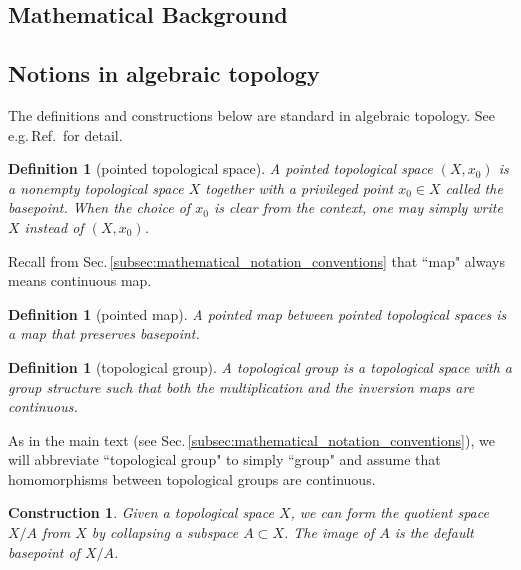 \documentclass[sort&compress]{elsarticle}
\theoremstyle{theoremstyle}
\theoremstyle{framedtheoremstyle}
\theoremstyle{definitionstyle}
\newtheorem{dfn}[nul]{Definition}%
\theoremstyle{definitionstyle}
\theoremstyle{definitionstyle}
\theoremstyle{definitionstyle}
\newtheorem{cnstr}[nul]{Construction}
\theoremstyle{nameddefinitionstyle}
\theoremstyle{framednameddefinitionstyle}
\theoremstyle{proofstyle}
\theoremstyle{definitionstyle}
\newcommand{\fromto}{\rightarrow}
\begin{document}
\begin{appendices}












\section{Mathematical Background\label{app:mathematical_background}}





\subsection{Notions in algebraic topology\label{subapp:notions_algebraic_topology}}

The definitions and constructions below are standard in algebraic topology. See e.g.\,Ref.\,\cite{Hatcher} for detail.

\begin{dfn}[pointed topological space]
A pointed topological space $(X,x_0)$ is a nonempty topological space $X$ together with a privileged point $x_0\in X$ called the basepoint. When the choice of $x_0$ is clear from the context, one may simply write $X$ instead of $(X,x_0)$.
\end{dfn}

Recall from Sec.\,\ref{subsec:mathematical_notation_conventions} that ``map" always means continuous map.

\begin{dfn}[pointed map]
A pointed map between pointed topological spaces is a map that preserves basepoint.
\end{dfn}

\begin{dfn}[topological group]
A topological group is a topological space with a group structure such that both the multiplication and the inversion maps are continuous.
\end{dfn}

As in the main text (see Sec.\,\ref{subsec:mathematical_notation_conventions}), we will abbreviate ``topological group" to simply ``group" and assume that homomorphisms between topological groups are continuous.

\begin{cnstr}
Given a topological space $X$, we can form the quotient space $X/A$ from $X$ by collapsing a subspace $A\subset X$. The image of $A$ is the default basepoint of $X/A$.
\end{cnstr}


\end{appendices}
\end{document}
